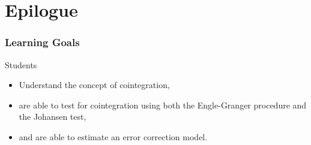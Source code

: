 \section{Epilogue}
\begin{frame}
\frametitle{Learning Goals}
Students
\begin{itemize}
\item Understand the concept of cointegration,
\item are able to test for cointegration using both the Engle-Granger procedure and the Johansen test,
\item and are able to estimate an error correction model.
\end{itemize}
\end{frame}

